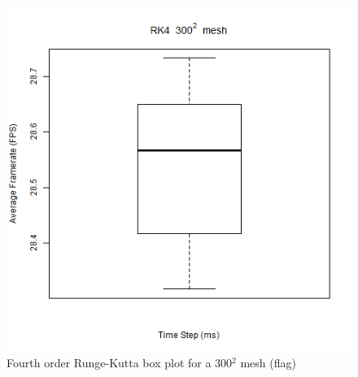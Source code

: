       \begin{figure}
    \begin{center}
      \includegraphics[scale=.9]{Figures/flag_rk4_300_box}
    \end{center}
    \caption{Fourth order Runge-Kutta box plot for a 300$^{2}$ mesh (flag)}
    \label{fig:rk4 box 300 flag}
  \end{figure}


